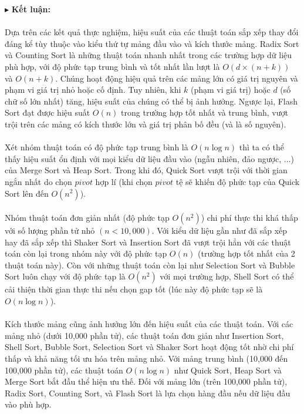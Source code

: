 $\blacktriangleright$ \textbf{Kết luận:}
\\\\
Dựa trên các kết quả thực nghiệm, hiệu suất của các thuật toán sắp xếp 
thay đổi đáng kể tùy thuộc vào kiểu thứ tự mảng đầu vào và kích thước 
mảng. Radix Sort và Counting Sort là những thuật toán nhanh nhất trong 
các trường hợp dữ liệu phù hợp, với độ phức tạp trung bình và tốt nhất 
lần lượt là $O\left(d\times\left(n+k\right)\right)$ và $O\left(n+k\right)$. 
Chúng hoạt động hiệu quả trên 
các mảng lớn có giá trị nguyên và phạm vi giá trị nhỏ hoặc cố định. Tuy 
nhiên, khi $k$ (phạm vi giá trị) hoặc $d$ (số chữ số lớn nhất) tăng, 
hiệu suất của chúng có thể bị ảnh hưởng. Ngược lại, Flash Sort đạt được 
hiệu suất $O\left(n\right)$ trong trường hợp tốt nhất và trung bình, vượt trội trên 
các mảng có kích thước lớn và giá trị phân bố đều (và là số nguyên).  
\\\\
Xét nhóm thuật toán có độ phức tạp trung bình là $O\left(n\log{n}\right)$ thì ta có 
thể thấy hiệu suất ổn định với mọi kiểu dữ liệu đầu vào (ngẫu nhiên, đảo 
ngược, ...) của Merge Sort và Heap Sort. Trong khi đó, Quick Sort vượt 
trội với thời gian ngắn nhất do chọn $pivot$ hợp lí (khi chọn $pivot$ tệ 
sẽ khiến độ phức tạp của Quick Sort lên đến $O\left(n^2\right)$). 
\\\\
Nhóm thuật toán đơn giản nhất (độ phức tạp $O\left(n^2\right)$) chi phí thực thi 
khá thấp với số lượng phần tử nhỏ $(n < 10,000)$. Với kiểu dữ liệu gần 
như đã sắp xếp hay đã sắp xếp thì Shaker Sort và Insertion Sort đã vượt 
trội hẳn với các thuật toán còn lại trong nhóm này với độ phức tạp $O\left(n\right)$ 
(trường hợp tốt nhất của 2 thuật toán này). Còn với những thuật toán còn 
lại như Selection Sort và Bubble Sort luôn chạy với độ phức tạp là $O\left(n^2\right)$ 
với mọi trường hợp, Shell Sort có thể cải thiện thời gian thực thi nếu 
chọn gap tốt (lúc này độ phức tạp sẽ là $O\left(n\log{n}\right)$).
\\\\
Kích thước mảng cũng ảnh hưởng lớn đến hiệu suất của các thuật toán. Với 
các mảng nhỏ (dưới 10,000 phần tử), các thuật toán đơn giản như Insertion 
Sort, Shell Sort, Bubble Sort,  Selection Sort và Shaker Sort hoạt động 
tốt nhờ chi phí thấp và khả năng tối ưu hóa trên mảng nhỏ. Với mảng trung 
bình (10,000 đến 100,000 phần tử), các thuật toán $O\left(n\log{n}\right)$ như Quick 
Sort, Heap Sort và Merge Sort bắt đầu thể hiện ưu thế. Đối với mảng lớn 
(trên 100,000 phần tử), Radix Sort, Counting Sort, và Flash Sort là lựa 
chọn hàng đầu nếu dữ liệu đầu vào phù hợp. 

